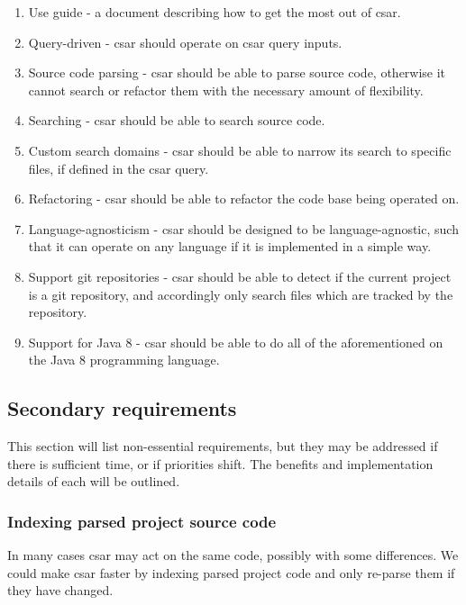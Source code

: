 \documentclass[12pt, letterpaper]{article}
\begin{document}
\begin{enumerate}
  \item Use guide - a document describing how to get the most out of csar.
  \item Query-driven - csar should operate on csar query inputs.
  \item Source code parsing - csar should be able to parse source code, otherwise it cannot search or refactor them with the necessary amount of flexibility.
  \item Searching - csar should be able to search source code.
  \item Custom search domains - csar should be able to narrow its search to specific files, if defined in the csar query.
  \item Refactoring - csar should be able to refactor the code base being operated on.
  \item Language-agnosticism - csar should be designed to be language-agnostic, such that it can operate on any language if it is implemented in a simple way.
  \item Support git repositories - csar should be able to detect if the current project is a git repository, and accordingly only search files which are tracked by the repository.
  \item Support for Java 8 - csar should be able to do all of the aforementioned on the Java 8 programming language.
\end{enumerate}

\subsection{Secondary requirements}
\label{sec:SecondaryRequirements}
This section will list non-essential requirements, but they may be addressed if there is sufficient time, or if priorities shift.
The benefits and implementation details of each will be outlined.

\subsubsection{Indexing parsed project source code}
In many cases csar may act on the same code, possibly with some differences.
We could make csar faster by indexing parsed project code and only re-parse them if they have changed.
\end{document}

